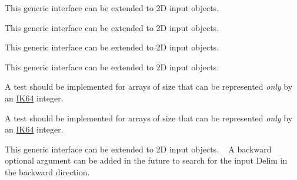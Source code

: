 \begin{DoxyRefList}
\item[Type \mbox{\hyperlink{interfaceArrayResize__mod_1_1resize}{Array\+Resize\+\_\+mod\+::resize}} ]\label{todo__todo000014}%
%
 This generic interface can be extended to 2D input objects. ~\newline
 
\item[Type \mbox{\hyperlink{interfaceArrayReverse__mod_1_1genReverse}{Array\+Reverse\+\_\+mod\+::gen\+Reverse}} ]\label{todo__todo000015}%
%
 This generic interface can be extended to 2D input objects. ~\newline
 
\item[Type \mbox{\hyperlink{interfaceArrayReverse__mod_1_1reverse}{Array\+Reverse\+\_\+mod\+::reverse}} ]\label{todo__todo000016}%
%
 This generic interface can be extended to 2D input objects. ~\newline
 
\item[Type \mbox{\hyperlink{interfaceArrayShuffle__mod_1_1shuffle}{Array\+Shuffle\+\_\+mod\+::shuffle}} ]\label{todo__todo000017}%
%
 This generic interface can be extended to 2D input objects. ~\newline
 
\item[Type \mbox{\hyperlink{interfaceArraySort__mod_1_1sort}{Array\+Sort\+\_\+mod\+::sort}} ]\label{todo__todo000018}%
%
 A test should be implemented for arrays of size that can be represented {\itshape only} by an \mbox{\hyperlink{namespaceConstants__mod_ad6aaf2f477491dc84e7ebbab3b64694e}{IK64}} integer. 
\item[Type \mbox{\hyperlink{interfaceArraySort__mod_1_1sortIndex}{Array\+Sort\+\_\+mod\+::sort\+Index}} ]\label{todo__todo000019}%
%
 A test should be implemented for arrays of size that can be represented {\itshape only} by an \mbox{\hyperlink{namespaceConstants__mod_ad6aaf2f477491dc84e7ebbab3b64694e}{IK64}} integer. 
\item[Type \mbox{\hyperlink{interfaceArraySplit__mod_1_1split}{Array\+Split\+\_\+mod\+::split}} ]\label{todo__todo000020}%
%
 This generic interface can be extended to 2D input objects. ~\newline
 A {\ttfamily backward} optional argument can be added in the future to search for the input {\ttfamily Delim} in the backward direction. ~\newline
 

\end{DoxyRefList}
